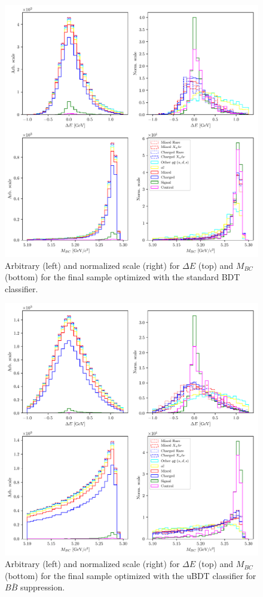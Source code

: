 \begin{figure}[H]
	\centering
	\captionsetup{width=0.8\linewidth}
	\includegraphics[width=\linewidth]{fig/opt_BB}
	\caption{Arbitrary (left) and normalized scale (right) for $\Delta E$ (top) and $M_{BC}$ (bottom) for the final sample optimized with the standard BDT classifier.}
	\label{fig:opt01c}
\end{figure} 

\begin{figure}[H]
	\centering
	\captionsetup{width=0.8\linewidth}
	\includegraphics[width=\linewidth]{fig/opt_uBB}
	\caption{Arbitrary (left) and normalized scale (right) for $\Delta E$ (top) and $M_{BC}$ (bottom) for the final sample optimized with the uBDT classifier for $B \bar B$ suppression.}
	\label{fig:opt1dc}
\end{figure} 

